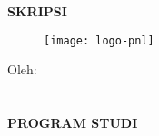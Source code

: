 \begin{center}
    \thispagestyle{empty}
\large
\MakeUppercase{\textbf{skripsi}}

\vfill
\begin{figure}[h]
\centering
\texttt{[image: logo-pnl]}
\end{figure}

\vfill
\normalsize
\MakeUppercase{\textbf{\judulId}}

\vfill
Oleh: \\
\MakeUppercase{\mahasiswa} \\
\nim \\

\vfill
\MakeUppercase{
\textbf{
program studi \prodi \\
\jurusan \\
\institusi \\
\the\year{}
}}

\end{center}